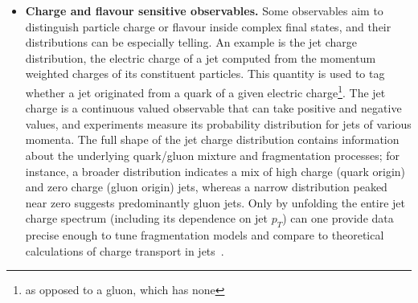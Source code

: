 \begin{itemize}
            Unfolding these jet substructure distributions in an unbinned way provides a high resolution view of QCD dynamics and is increasingly necessary as theory tools\footnote{like analytic resummation or first principles simulation} improve to the point of predicting differential shapes~\cite{Canelli:2025ybb, H1:2021wkz, Shmakov:2024gkd}.
            In fact, recent measurements have demonstrated the power of full phase space unfolding for jets, using multivariate ML techniques to correct detector effects and obtain particle level jet observable spectra without binning~\cite{Arratia:2021otl, Milton:2025mug,collaboration_machine_2024, collaboration_machine_2025, Aguilar-Saavedra:2014kpa}.
            These cases underscore that jet physics benefits enormously from preserving the full shape information.
        \item \textbf{Charge and flavour sensitive observables.}
            Some observables aim to distinguish particle charge or flavour inside complex final states, and their distributions can be especially telling.
            An example is the jet charge distribution, the electric charge of a jet computed from the momentum weighted charges of its constituent particles.
            This quantity is used to tag whether a jet originated from a quark of a given electric charge\footnote{as opposed to a gluon, which has none}.
            The jet charge is a continuous valued observable that can take positive and negative values, and experiments measure its probability distribution for jets of various momenta.
            The full shape of the jet charge distribution contains information about the underlying quark/gluon mixture and fragmentation processes;
            for instance, a broader distribution indicates a mix of high charge (quark origin) and zero charge (gluon origin) jets, whereas a narrow distribution peaked near zero suggests predominantly gluon jets.
            Only by unfolding the entire jet charge spectrum (including its dependence on jet $p_T$) can one provide data precise enough to tune fragmentation models and compare to theoretical calculations of charge transport in jets~\cite{CMS:2017yer,CMS:2020plq,Larkoski:2024uoc,Accardi:2022oog,Baldenegro:2024pfb,AbdulKhalek:2021gbh, Larkoski:2020JetLearning}.
            

\end{itemize}
